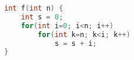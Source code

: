 \begin{lstlisting}[language=C++]
int f(int n) {
    int s = 0;
    for(int i=0; i<n; i++)
        for(int k=n; k<i; k++)
            s = s + i;
}
\end{lstlisting}
